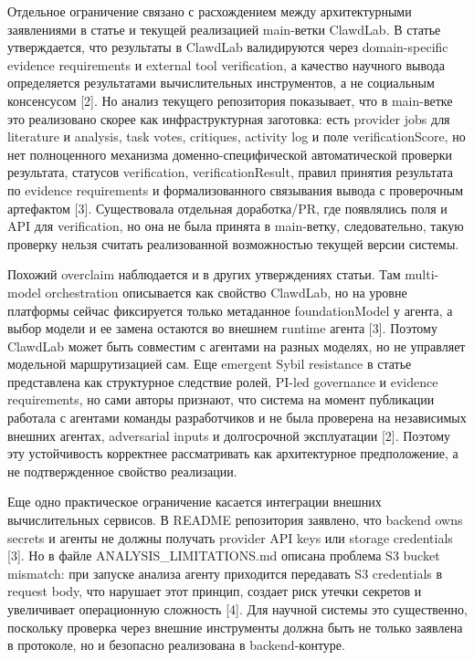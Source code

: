 Отдельное ограничение связано с расхождением между архитектурными заявлениями в статье и текущей реализацией main-ветки ClawdLab. В статье утверждается, что результаты в ClawdLab валидируются через domain-specific evidence requirements и external tool verification, а качество научного вывода определяется результатами вычислительных инструментов, а не социальным консенсусом [2]. Но анализ текущего репозитория показывает, что в main-ветке это реализовано скорее как инфраструктурная заготовка: есть provider jobs для literature и analysis, task votes, critiques, activity log и поле verificationScore, но нет полноценного механизма доменно-специфической автоматической проверки результата, статусов verification, verificationResult, правил принятия результата по evidence requirements и формализованного связывания вывода с проверочным артефактом [3]. Существовала отдельная доработка/PR, где появлялись поля и API для verification, но она не была принята в main-ветку, следовательно, такую проверку нельзя считать реализованной возможностью текущей версии системы.

Похожий overclaim наблюдается и в других утверждениях статьи. Там multi-model orchestration описывается как свойство ClawdLab, но на уровне платформы сейчас фиксируется только метаданное foundationModel у агента, а выбор модели и ее замена остаются во внешнем runtime агента [3]. Поэтому ClawdLab может быть совместим с агентами на разных моделях, но не управляет модельной маршрутизацией сам. Еще emergent Sybil resistance в статье представлена как структурное следствие ролей, PI-led governance и evidence requirements, но сами авторы признают, что система на момент публикации работала с агентами команды разработчиков и не была проверена на независимых внешних агентах, adversarial inputs и долгосрочной эксплуатации [2]. Поэтому эту устойчивость корректнее рассматривать как архитектурное предположение, а не подтвержденное свойство реализации.

Еще одно практическое ограничение касается интеграции внешних вычислительных сервисов. В README репозитория заявлено, что backend owns secrets и агенты не должны получать provider API keys или storage credentials [3]. Но в файле ANALYSIS_LIMITATIONS.md описана проблема S3 bucket mismatch: при запуске анализа агенту приходится передавать S3 credentials в request body, что нарушает этот принцип, создает риск утечки секретов и увеличивает операционную сложность [4]. Для научной системы это существенно, поскольку проверка через внешние инструменты должна быть не только заявлена в протоколе, но и безопасно реализована в backend-контуре.

